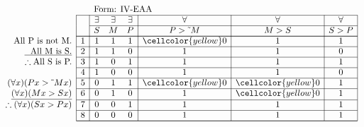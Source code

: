 \documentclass[10pt,legalpaper,landscape,cmtt]{article}
\begin{document}
{\begin{minipage}[t]{3.25in}
	\(
	\begin{array}{r|c|ccc|c|c|c|}
		\multicolumn{2}{c}{}&\multicolumn{6}{l}{\mbox{Form: IV-EAA}} \\ \cline{2-8}
		\hspace{1in}	&	& \exists & \exists & \exists & \forall & \forall & \forall\\ \cline{3-8}
		&	& S & M & P &  P > \tilde~M  &  M > S  &  S > P \\ \cline{2-8} \cline{2-8}
		\phantom{\therefore}\mbox{All P is not M.}   & 1 & 1 & 1 & 1 &   \cellcolor{yellow} 0   &   1   &   1  \\ \cline{2-8}
		\underline{\phantom{\therefore}\mbox{All M is S.}}   & 2 & 1 & 1 & 0 &   1   &   1   &   0  \\ \cline{2-8}
		\therefore \mbox{All S is P.}   & 3 & 1 & 0 & 1 &   1   &   1   &   1  \\ \cline{2-8}
		& 4 & 1 & 0 & 0 &   1   &   1   &   0  \\ \cline{2-8}
		(\forall x)(Px > \tilde~Mx)   & 5 & 0 & 1 & 1 &   \cellcolor{yellow} 0   &   \cellcolor{yellow} 0   &   1  \\ \cline{2-8}
		\underline{(\forall x)(Mx > Sx)}   & 6 & 0 & 1 & 0 &   1   &   \cellcolor{yellow} 0   &   1  \\ \cline{2-8}
		\therefore(\forall x)(Sx > Px)   & 7 & 0 & 0 & 1 &   1   &   1   &   1  \\ \cline{2-8}
		& 8 & 0 & 0 & 0 &   1   &   1   &   1   \\ \cline{2-8}\cline{2-8} 
	\end{array}
	\)
\end{minipage}

}
\end{document}
